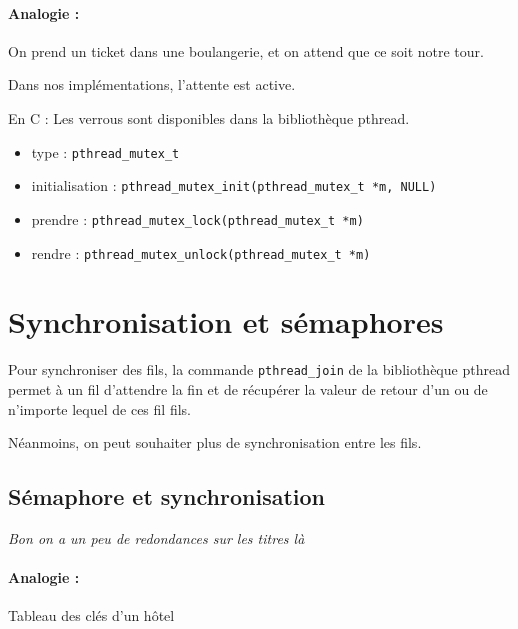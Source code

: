 \paragraph{Analogie :} On prend un ticket dans une boulangerie, et on attend que ce soit notre tour.

\begin{rem}
	Dans nos implémentations, l'attente est active.
\end{rem}

\begin{impl}
	\normalfont
	En C : Les verrous sont disponibles dans la bibliothèque pthread. \begin{itemize}[label=]
		\item type : \texttt{pthread\_mutex\_t}
		\item initialisation : \texttt{pthread\_mutex\_init(pthread\_mutex\_t *m, NULL)}
		\item prendre : \texttt{pthread\_mutex\_lock(pthread\_mutex\_t *m)}
		\item rendre : \texttt{pthread\_mutex\_unlock(pthread\_mutex\_t *m)}
	\end{itemize}
\end{impl}

\section{Synchronisation et sémaphores}

\begin{impl}
	Pour synchroniser des fils, la commande \texttt{pthread\_join} de la bibliothèque pthread permet à un fil d'attendre la fin et de récupérer la valeur de retour d'un ou de n'importe lequel de ces fil fils.
\end{impl}

\begin{rem}
    Néanmoins, on peut souhaiter plus de synchronisation entre les fils.
\end{rem}

\subsection{Sémaphore et synchronisation}
\textit{Bon on a un peu de redondances sur les titres là}

\paragraph{Analogie :} Tableau des clés d'un hôtel

